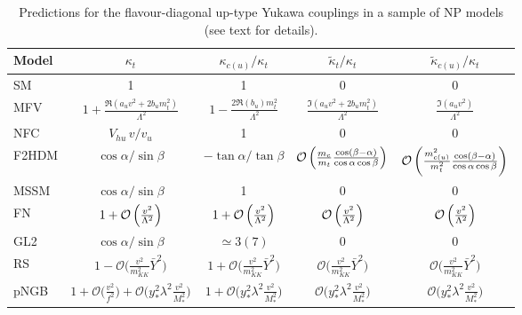 \documentclass[../report.tex]{subfiles}
\begin{document}
\begin{table}[t]
\begin{center}
\begin{tabular}{l  c  c  c c  }
\toprule[0.1em]
Model	& $\kappa_t$ & $\kappa_{c (u)}/\kappa_t$  & $\tilde \kappa_t/\kappa_t$ & $\tilde \kappa_{c (u)}/\kappa_t$ \\ \midrule[0.05em]
SM	& 1	& 1 & 0 & 0 \\
MFV &$1+\frac{\Re(a_uv^2+2b_u m_t^2)}{\Lambda^2}$
&$1-\frac{2\Re(b_u)m_t^2}{\Lambda^2}$
&$\frac{\Im(a_uv^2+2b_u m_t^2)}{\Lambda^2}$ & $\frac{\Im(a_u
  v^2)}{\Lambda^2} $ \\
NFC & $V_{hu}\,v/v_u$	& 1 &  0 &0 \\
F2HDM & $\cos\alpha/\sin\beta$	& $-\tan\alpha/\tan\beta$ & $\mathcal{O}\left(\frac{m_c}{m_t}\frac{\cos(\beta-\alpha)}{\cos\alpha\cos\beta}\right)$ & $\mathcal{O}\left(\frac{m_{c(u)}^2}{m_t^2} \frac{\cos(\beta-\alpha)}{\cos\alpha\cos\beta}\right)$ \\
MSSM	& $\cos\alpha/\sin\beta$	&1 &0  &0\\
FN & $1+\mathcal{O}\left(\frac{v^2}{\Lambda^2}\right)$ &
	$1+\mathcal{O}\left(\frac{v^2}{\Lambda^2}\right)$ &
	$\mathcal{O}\left(\frac{v^2}{\Lambda^2}\right)$ &
	$\mathcal{O}\left(\frac{v^2}{\Lambda^2}\right)$ \\
GL2 	& $\cos\alpha/\sin\beta$& $\simeq 3(7)$ & 0 & 0 \\
RS &$1-{\mathcal O}\Big(\frac{ v^2}{m_{KK}^2}\bar Y^2\Big)$&$1+{\mathcal O}\Big(\frac{ v^2}{m_{KK}^2}\bar Y^2\Big)$ &${\mathcal O}\Big(\frac{ v^2}{m_{KK}^2}\bar Y^2\Big)$ &${\mathcal O}\Big(\frac{ v^2}{m_{KK}^2}\bar Y^2\Big)$ \\
pNGB & $1+{\mathcal O}\Big(\frac{ v^2}{f^2}\Big)+{\mathcal O}\Big(y_*^2 \lambda^2 \frac{ v^2}{M_*^2}\Big)$ & $1+{\mathcal O}\Big(y_*^2 \lambda^2 \frac{ v^2}{M_*^2}\Big)$ & ${\mathcal O}\Big(y_*^2 \lambda^2 \frac{ v^2}{M_*^2}\Big)$ & ${\mathcal O}\Big(y_*^2 \lambda^2 \frac{ v^2}{M_*^2}\Big)$ \\
\bottomrule[0.1em]
\end{tabular}
\caption{Predictions for the flavour-diagonal up-type Yukawa couplings
  in a sample of NP models (see text for details).
}
\label{tab:upyukawa}
\end{center}
\end{table}
\end{document}
